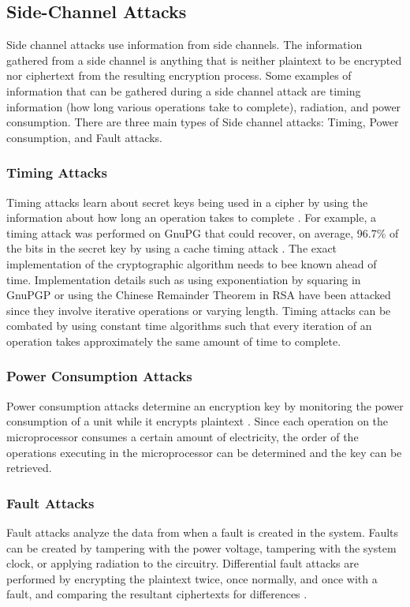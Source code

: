 \documentclass[12pt]{article}
\begin{document}
\subsection{Side-Channel Attacks}
Side channel attacks use information from side channels. The information gathered from a side channel is anything that is neither plaintext to be encrypted nor ciphertext from the resulting encryption process. Some examples of information that can be gathered during a side channel attack are timing information (how long various operations take to complete), radiation, and power consumption. There are three main types of Side channel attacks: Timing, Power consumption, and Fault attacks\cite[pg. 2-3]{sidechannel}.

\subsubsection{Timing Attacks}
Timing attacks learn about secret keys being used in a cipher by using the information about how long an operation takes to complete \cite[pg 3]{sidechannel}. For example, a timing attack was performed on GnuPG that could recover, on average, 96.7\% of the bits in the secret key by using a cache timing attack \cite[pg. 719]{flushreload}. The exact implementation of the cryptographic algorithm needs to bee known ahead of time. Implementation details such as using exponentiation by squaring in GnuPGP or using the Chinese Remainder Theorem in RSA have been attacked since they involve iterative operations or varying length. Timing attacks can be combated by using constant time algorithms such that every iteration of an operation takes approximately the same amount of time to complete.

\subsubsection{Power Consumption Attacks}
Power consumption attacks determine an encryption key by monitoring the power consumption of a unit while it encrypts plaintext \cite[pg. 6]{sidechannel}. Since each operation on the microprocessor consumes a certain amount of electricity, the order of the operations executing in the microprocessor can be determined and the key can be retrieved.

\subsubsection{Fault Attacks}
Fault attacks analyze the data from when a fault is created in the system. Faults can be created by tampering with the power voltage, tampering with the system clock, or applying radiation to the circuitry. Differential fault attacks are performed by encrypting the plaintext twice, once normally, and once with a fault, and comparing the resultant ciphertexts for differences \cite[pg. 7]{sidechannel}.
\end{document}

